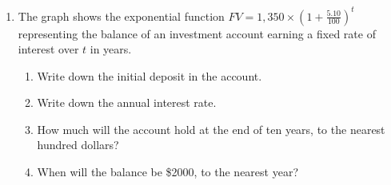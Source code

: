 \documentclass[12pt, twoside]{article}
\begin{document}
\begin{enumerate}
\newpage
\item The graph shows the exponential function $\displaystyle FV=1,350 \times \left( 1+\frac{5.10}{100} \right)^t$ representing the balance of an investment account earning a fixed rate of interest over $t$ in years.
\begin{multicols}{2}
    \begin{enumerate}[itemsep=1cm]
        \item Write down the initial deposit in the account.
        \item Write down the annual interest rate.
        \item How much will the account hold at the end of ten years, to the nearest hundred dollars?
        \item When will the balance be \$2000, to the nearest year?
    \end{enumerate}\vspace{1cm}
    \begin{center}
    \end{center}
    \end{multicols}


\end{enumerate}
\end{document}
